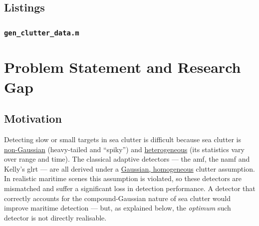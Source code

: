 \documentclass{article}
\begin{document}
\subsection{Listings}\label{sec:code:listings}

\subsubsection*{\texttt{gen\_clutter\_data.m}}


% 

% 

% 


\newpage
\section{Problem Statement and Research Gap}

\subsection{Motivation}
Detecting slow or small targets in sea clutter is difficult because sea clutter is \underline{non-Gaussian} (heavy-tailed and ``spiky'') and \underline{heterogeneous} (its statistics vary over range and time). The classical adaptive detectors --- the \gls{amf}, the \gls{namf} and Kelly's \gls{glrt} --- are all derived under a \underline{Gaussian, homogeneous} clutter assumption. In realistic maritime scenes this assumption is violated, so these detectors are mismatched and suffer a significant loss in detection performance. A detector that correctly accounts for the compound-Gaussian nature of sea clutter would improve maritime detection --- but, as explained below, the \emph{optimum} such detector is not directly realisable.
\end{document}
